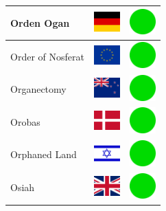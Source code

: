 \documentclass[12pt, a4paper, twoside]{report}
\begin{document}
\begin{center}
\begin{longtable}{|p{5cm}|p{2cm}|p{2cm}|}
 Orden Ogan                                                 & \includegraphics[width=1cm]{../img/flags/de} &   \includegraphics[width=1cm]{../likes/y} \\ \hline
 Order of Nosferat                                          & \includegraphics[width=1cm]{../img/flags/eu} &   \includegraphics[width=1cm]{../likes/y} \\ \hline
 Organectomy                                                & \includegraphics[width=1cm]{../img/flags/nz} &   \includegraphics[width=1cm]{../likes/y} \\ \hline
 Orobas                                                     & \includegraphics[width=1cm]{../img/flags/dk} &   \includegraphics[width=1cm]{../likes/y} \\ \hline
 Orphaned Land                                              & \includegraphics[width=1cm]{../img/flags/il} &   \includegraphics[width=1cm]{../likes/y} \\ \hline
 Osiah                                                      & \includegraphics[width=1cm]{../img/flags/gb} &   \includegraphics[width=1cm]{../likes/y} \\ \hline

\end{longtable}
\end{center}
\end{document}
